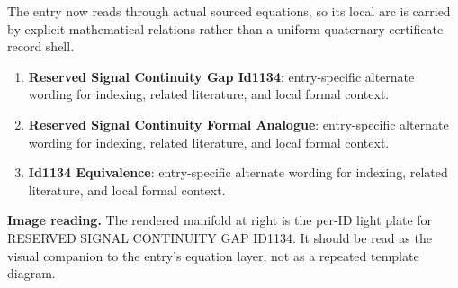 The entry now reads through actual sourced equations, so its local arc is carried by explicit mathematical relations rather than a uniform quaternary certificate record shell.
\endgroup

\begin{enumerate}[leftmargin=1.6em,itemsep=6pt,topsep=4pt]
\item \textbf{Reserved Signal Continuity Gap Id1134}: entry-specific alternate wording for indexing, related literature, and local formal context.
\item \textbf{Reserved Signal Continuity Formal Analogue}: entry-specific alternate wording for indexing, related literature, and local formal context.
\item \textbf{Id1134 Equivalence}: entry-specific alternate wording for indexing, related literature, and local formal context.
\end{enumerate}

\begin{samepage}
\noindent\begin{minipage}[t]{0.45\linewidth}
\vspace{0pt}
\raggedright
\scriptsize\textbf{Image reading.} The rendered manifold at right is the per-ID light plate for RESERVED SIGNAL CONTINUITY GAP ID1134. It should be read as the visual companion to the entry's equation layer, not as a repeated template diagram.\par
\end{minipage}\hfill
\begin{minipage}[t]{0.53\linewidth}
\vspace*{-0.10in}
\raggedright
{}
\end{minipage}
\end{samepage}

\clearpage


